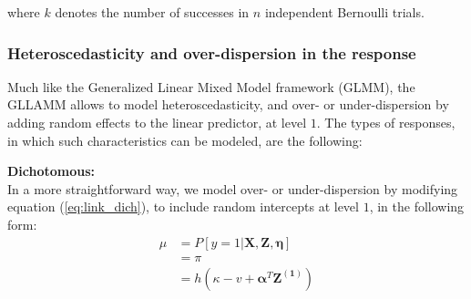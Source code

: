 	where $k$ denotes the number of successes in $n$ independent Bernoulli trials.
	



\subsubsection{Heteroscedasticity and over-dispersion in the response} \label{ss_sect:het}

Much like the Generalized Linear Mixed Model framework (GLMM), the GLLAMM allows to model heteroscedasticity, and over- or under-dispersion by adding random effects to the linear predictor, at level $1$. The types of responses, in which such characteristics can be modeled, are the following:
	
\textbf{Dichotomous:} \\
	In a more straightforward way, we model over- or under-dispersion by modifying equation (\ref{eq:link_dich}), to include random intercepts at level $1$, in the following form:
	\begin{equation} \label{eq:link_dich1}
		\begin{split}
			\mu &= P[y=1 | \mathbf{X}, \mathbf{Z}, \pmb{\eta}] \\
			&= \pi \\
			&= h(\kappa - v + \pmb{\alpha}^{T}\mathbf{Z^{(1)}})
		\end{split}	
	\end{equation}
	
	


